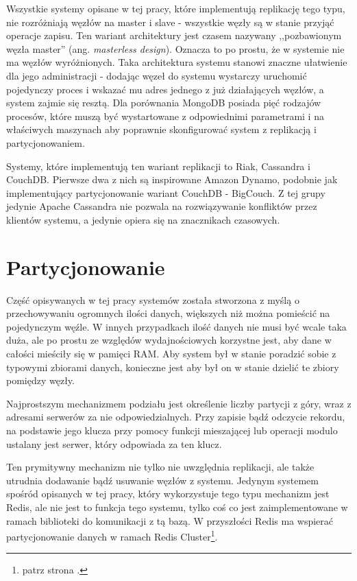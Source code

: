 Wszystkie systemy opisane w tej pracy, które implementują replikację tego typu, nie rozróżniają węzłów na master i slave - wszystkie węzły są w stanie przyjąć operacje zapisu.
Ten wariant architektury jest czasem nazywany ,,pozbawionym węzła master'' (ang. \emph{masterless design}).
Oznacza to po prostu, że w systemie nie ma węzłów wyróżnionych.
Taka architektura systemu stanowi znaczne ułatwienie dla jego administracji - dodając węzeł do systemu wystarczy uruchomić pojedynczy proces i wskazać mu adres jednego z już działających węzłów, a system zajmie się resztą.
Dla porównania MongoDB posiada pięć rodzajów procesów, które muszą być wystartowane z odpowiednimi parametrami i na właściwych maszynach aby poprawnie skonfigurować system z replikacją i partycjonowaniem.

Systemy, które implementują ten wariant replikacji to Riak, Cassandra i CouchDB.
Pierwsze dwa z nich są inspirowane Amazon Dynamo, podobnie jak implementujący partycjonowanie wariant CouchDB - BigCouch.
Z tej grupy jedynie Apache Cassandra nie pozwala na rozwiązywanie konfliktów przez klientów systemu, a jedynie opiera się na znacznikach czasowych.

\section{Partycjonowanie}

Część opisywanych w tej pracy systemów została stworzona z myślą o przechowywaniu ogromnych ilości danych, większych niż można pomieścić na pojedynczym węźle.
W innych przypadkach ilość danych nie musi być wcale taka duża, ale po prostu ze względów wydajnościowych korzystne jest, aby dane w całości mieściły się w pamięci RAM. Aby system był w stanie poradzić sobie z typowymi zbiorami danych, konieczne jest aby był on w stanie dzielić te zbiory pomiędzy węzły.

Najprostszym mechanizmem podziału jest określenie liczby partycji z góry, wraz z adresami serwerów za nie odpowiedzialnych.
Przy zapisie bądź odczycie rekordu, na podstawie jego klucza przy pomocy funkcji mieszającej lub operacji modulo ustalany jest serwer, który odpowiada za ten klucz.

Ten prymitywny mechanizm nie tylko nie uwzględnia replikacji, ale także utrudnia dodawanie bądź usuwanie węzłów z systemu.
Jedynym systemem spośród opisanych w tej pracy, który wykorzystuje tego typu mechanizm jest Redis, ale nie jest to funkcja tego systemu, tylko coś co jest zaimplementowane w ramach biblioteki do komunikacji z tą bazą.
W przyszłości Redis ma wspierać partycjonowanie danych w ramach Redis Cluster\footnote{patrz strona \pageref{sec:redis-cluster}.}.

